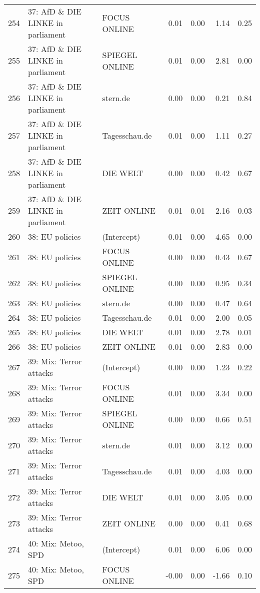 \begin{table}[ht]
{\begin{tabular}{rllrrrr}
  254 & 37: AfD \& DIE LINKE in parliament & FOCUS ONLINE & 0.01 & 0.00 & 1.14 & 0.25 \\ 
  255 & 37: AfD \& DIE LINKE in parliament & SPIEGEL ONLINE & 0.01 & 0.00 & 2.81 & 0.00 \\ 
  256 & 37: AfD \& DIE LINKE in parliament & stern.de & 0.00 & 0.00 & 0.21 & 0.84 \\ 
  257 & 37: AfD \& DIE LINKE in parliament & Tagesschau.de & 0.01 & 0.00 & 1.11 & 0.27 \\ 
  258 & 37: AfD \& DIE LINKE in parliament & DIE WELT & 0.00 & 0.00 & 0.42 & 0.67 \\ 
  259 & 37: AfD \& DIE LINKE in parliament & ZEIT ONLINE & 0.01 & 0.01 & 2.16 & 0.03 \\ 
  260 & 38: EU policies & (Intercept) & 0.01 & 0.00 & 4.65 & 0.00 \\ 
  261 & 38: EU policies & FOCUS ONLINE & 0.00 & 0.00 & 0.43 & 0.67 \\ 
  262 & 38: EU policies & SPIEGEL ONLINE & 0.00 & 0.00 & 0.95 & 0.34 \\ 
  263 & 38: EU policies & stern.de & 0.00 & 0.00 & 0.47 & 0.64 \\ 
  264 & 38: EU policies & Tagesschau.de & 0.01 & 0.00 & 2.00 & 0.05 \\ 
  265 & 38: EU policies & DIE WELT & 0.01 & 0.00 & 2.78 & 0.01 \\ 
  266 & 38: EU policies & ZEIT ONLINE & 0.01 & 0.00 & 2.83 & 0.00 \\ 
  267 & 39: Mix: Terror attacks & (Intercept) & 0.00 & 0.00 & 1.23 & 0.22 \\ 
  268 & 39: Mix: Terror attacks & FOCUS ONLINE & 0.01 & 0.00 & 3.34 & 0.00 \\ 
  269 & 39: Mix: Terror attacks & SPIEGEL ONLINE & 0.00 & 0.00 & 0.66 & 0.51 \\ 
  270 & 39: Mix: Terror attacks & stern.de & 0.01 & 0.00 & 3.12 & 0.00 \\ 
  271 & 39: Mix: Terror attacks & Tagesschau.de & 0.01 & 0.00 & 4.03 & 0.00 \\ 
  272 & 39: Mix: Terror attacks & DIE WELT & 0.01 & 0.00 & 3.05 & 0.00 \\ 
  273 & 39: Mix: Terror attacks & ZEIT ONLINE & 0.00 & 0.00 & 0.41 & 0.68 \\ 
  274 & 40: Mix: Metoo, SPD & (Intercept) & 0.01 & 0.00 & 6.06 & 0.00 \\ 
  275 & 40: Mix: Metoo, SPD & FOCUS ONLINE & -0.00 & 0.00 & -1.66 & 0.10 \\ 

\end{tabular}}
\end{table}
